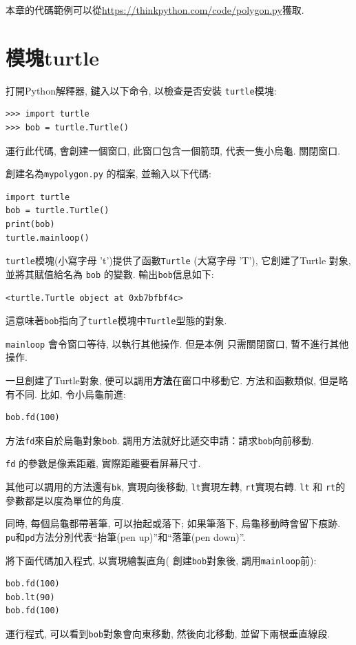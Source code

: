 \documentclass[10pt]{book}
\begin{document}
本章的代碼範例可以從\url{https://thinkpython.com/code/polygon.py}獲取. 


\section{模塊turtle}
\label{turtle}

打開Python解釋器, 鍵入以下命令, 以檢查是否安裝 {\tt turtle}模塊:

\begin{verbatim}
>>> import turtle
>>> bob = turtle.Turtle()
\end{verbatim}

運行此代碼, 會創建一個窗口, 此窗口包含一個箭頭, 代表一隻小烏龜. 
關閉窗口. 

創建名為{\tt mypolygon.py} 的檔案, 並輸入以下代碼:

\begin{verbatim}
import turtle
bob = turtle.Turtle()
print(bob)
turtle.mainloop()
\end{verbatim}
%
 {\tt turtle}模塊(小寫字母 't')提供了函數{\tt Turtle} (大寫字母 'T'), 
它創建了Turtle 對象, 並將其賦值給名為 {\tt bob} 的變數. 
輸出{\tt bob}信息如下:

\begin{verbatim}
<turtle.Turtle object at 0xb7bfbf4c>
\end{verbatim}
%
這意味著{\tt bob}指向了{\tt turtle}模塊中{\tt Turtle}型態的對象.

\verb"mainloop" 會令窗口等待, 以執行其他操作. 但是本例
只需關閉窗口, 暫不進行其他操作. 

一旦創建了Turtle對象, 便可以調用{\bf 方法}在窗口中移動它. 
方法和函數類似, 但是略有不同. 比如, 令小烏龜前進:

\begin{verbatim}
bob.fd(100)
\end{verbatim}
%
方法{\tt fd}來自於烏龜對象{\tt bob}. 
調用方法就好比遞交申請：請求{\tt bob}向前移動. 

{\tt fd} 的參數是像素距離, 實際距離要看屏幕尺寸. 

其他可以調用的方法還有{\tt bk}, 實現向後移動, 
{\tt lt}實現左轉, {\tt rt}實現右轉. 
{\tt lt} 和 {\tt rt}的參數都是以度為單位的角度. 

同時, 每個烏龜都帶著筆, 可以抬起或落下;
如果筆落下, 烏龜移動時會留下痕跡. 
{\tt pu}和{\tt pd}方法分別代表``抬筆(pen up)''和``落筆(pen down)''.

將下面代碼加入程式, 以實現繪製直角(
創建{\tt bob}對象後, 調用\verb"mainloop"前):

\begin{verbatim}
bob.fd(100)
bob.lt(90)
bob.fd(100)
\end{verbatim}
%
運行程式, 可以看到{\tt bob}對象會向東移動, 然後向北移動, 並留下兩根垂直線段. 
\end{document}
